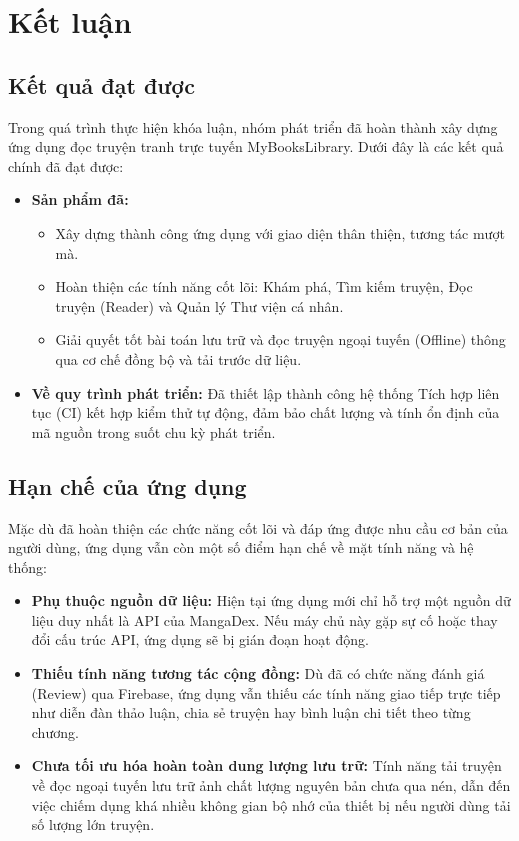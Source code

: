 \chapter{Kết luận}
\label{chap:conclusion}

\section{Kết quả đạt được}
Trong quá trình thực hiện khóa luận, nhóm phát triển đã hoàn thành xây dựng ứng dụng đọc truyện tranh trực tuyến MyBooksLibrary. Dưới đây là các kết quả chính đã đạt được:
\begin{itemize}
    \item \textbf{Sản phẩm đã:} 
    \begin{itemize}
        \item Xây dựng thành công ứng dụng với giao diện thân thiện, tương tác mượt mà.
        \item Hoàn thiện các tính năng cốt lõi: Khám phá, Tìm kiếm truyện, Đọc truyện (Reader) và Quản lý Thư viện cá nhân.
        \item Giải quyết tốt bài toán lưu trữ và đọc truyện ngoại tuyến (Offline) thông qua cơ chế đồng bộ và tải trước dữ liệu.
    \end{itemize}
    \item \textbf{Về quy trình phát triển:} Đã thiết lập thành công hệ thống Tích hợp liên tục (CI) kết hợp kiểm thử tự động, đảm bảo chất lượng và tính ổn định của mã nguồn trong suốt chu kỳ phát triển.
\end{itemize}

\section{Hạn chế của ứng dụng}
Mặc dù đã hoàn thiện các chức năng cốt lõi và đáp ứng được nhu cầu cơ bản của người dùng, ứng dụng vẫn còn một số điểm hạn chế về mặt tính năng và hệ thống:
\begin{itemize}
    \item \textbf{Phụ thuộc nguồn dữ liệu:} Hiện tại ứng dụng mới chỉ hỗ trợ một nguồn dữ liệu duy nhất là API của MangaDex. Nếu máy chủ này gặp sự cố hoặc thay đổi cấu trúc API, ứng dụng sẽ bị gián đoạn hoạt động.
    \item \textbf{Thiếu tính năng tương tác cộng đồng:} Dù đã có chức năng đánh giá (Review) qua Firebase, ứng dụng vẫn thiếu các tính năng giao tiếp trực tiếp như diễn đàn thảo luận, chia sẻ truyện hay bình luận chi tiết theo từng chương.
    \item \textbf{Chưa tối ưu hóa hoàn toàn dung lượng lưu trữ:} Tính năng tải truyện về đọc ngoại tuyến lưu trữ ảnh chất lượng nguyên bản chưa qua nén, dẫn đến việc chiếm dụng khá nhiều không gian bộ nhớ của thiết bị nếu người dùng tải số lượng lớn truyện.
\end{itemize}

